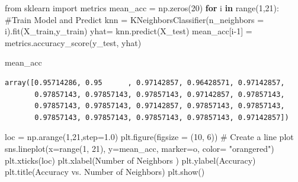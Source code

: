 \documentclass[
  letterpaper,
  DIV=11,
  numbers=noendperiod]{scrreprt}
\newenvironment{Shaded}{\begin{snugshade}}{\end{snugshade}}
\newcommand{\BuiltInTok}[1]{\textcolor[rgb]{0.00,0.23,0.31}{#1}}
\newcommand{\CommentTok}[1]{\textcolor[rgb]{0.37,0.37,0.37}{#1}}
\newcommand{\ControlFlowTok}[1]{\textcolor[rgb]{0.00,0.23,0.31}{\textbf{#1}}}
\newcommand{\DecValTok}[1]{\textcolor[rgb]{0.68,0.00,0.00}{#1}}
\newcommand{\FloatTok}[1]{\textcolor[rgb]{0.68,0.00,0.00}{#1}}
\newcommand{\ImportTok}[1]{\textcolor[rgb]{0.00,0.46,0.62}{#1}}
\newcommand{\KeywordTok}[1]{\textcolor[rgb]{0.00,0.23,0.31}{\textbf{#1}}}
\newcommand{\NormalTok}[1]{\textcolor[rgb]{0.00,0.23,0.31}{#1}}
\newcommand{\OperatorTok}[1]{\textcolor[rgb]{0.37,0.37,0.37}{#1}}
\newcommand{\StringTok}[1]{\textcolor[rgb]{0.13,0.47,0.30}{#1}}
\begin{document}
\begin{Shaded}
\begin{Highlighting}[]
\ImportTok{from}\NormalTok{ sklearn }\ImportTok{import}\NormalTok{ metrics}
\NormalTok{mean\_acc }\OperatorTok{=}\NormalTok{ np.zeros(}\DecValTok{20}\NormalTok{)}
\ControlFlowTok{for}\NormalTok{ i }\KeywordTok{in} \BuiltInTok{range}\NormalTok{(}\DecValTok{1}\NormalTok{,}\DecValTok{21}\NormalTok{):}
\CommentTok{\#Train Model and Predict  }
\NormalTok{    knn }\OperatorTok{=}\NormalTok{ KNeighborsClassifier(n\_neighbors }\OperatorTok{=}\NormalTok{ i).fit(X\_train,y\_train)}
\NormalTok{    yhat}\OperatorTok{=}\NormalTok{ knn.predict(X\_test)}
\NormalTok{    mean\_acc[i}\OperatorTok{{-}}\DecValTok{1}\NormalTok{] }\OperatorTok{=}\NormalTok{ metrics.accuracy\_score(y\_test, yhat)}

\NormalTok{mean\_acc}
\end{Highlighting}
\end{Shaded}

\begin{verbatim}
array([0.95714286, 0.95      , 0.97142857, 0.96428571, 0.97142857,
       0.97857143, 0.97857143, 0.97857143, 0.97142857, 0.97857143,
       0.97857143, 0.97857143, 0.97142857, 0.97857143, 0.97857143,
       0.97857143, 0.97857143, 0.97857143, 0.97857143, 0.97142857])
\end{verbatim}

\begin{Shaded}
\begin{Highlighting}[]
\NormalTok{loc }\OperatorTok{=}\NormalTok{ np.arange(}\DecValTok{1}\NormalTok{,}\DecValTok{21}\NormalTok{,step}\OperatorTok{=}\FloatTok{1.0}\NormalTok{)}
\NormalTok{plt.figure(figsize }\OperatorTok{=}\NormalTok{ (}\DecValTok{10}\NormalTok{, }\DecValTok{6}\NormalTok{))}
\CommentTok{\# Create a line plot }
\NormalTok{sns.lineplot(x}\OperatorTok{=}\BuiltInTok{range}\NormalTok{(}\DecValTok{1}\NormalTok{, }\DecValTok{21}\NormalTok{), y}\OperatorTok{=}\NormalTok{mean\_acc, marker}\OperatorTok{=}\StringTok{\textquotesingle{}o\textquotesingle{}}\NormalTok{, color}\OperatorTok{=} \StringTok{"orangered"}\NormalTok{)}
\NormalTok{plt.xticks(loc)}
\NormalTok{plt.xlabel(}\StringTok{\textquotesingle{}Number of Neighbors \textquotesingle{}}\NormalTok{)}
\NormalTok{plt.ylabel(}\StringTok{\textquotesingle{}Accuracy\textquotesingle{}}\NormalTok{)}
\NormalTok{plt.title(}\StringTok{\textquotesingle{}Accuracy vs. Number of Neighbors\textquotesingle{}}\NormalTok{)}
\NormalTok{plt.show()}
\end{Highlighting}
\end{Shaded}
\end{document}
